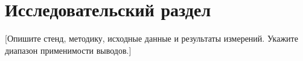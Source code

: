 \section{Исследовательский раздел}

[Опишите стенд, методику, исходные данные и результаты измерений.
Укажите диапазон применимости выводов.]
